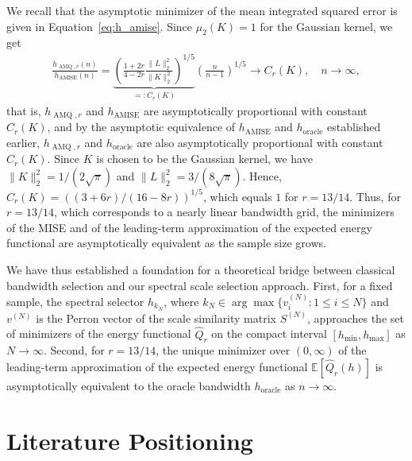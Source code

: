 We recall that the asymptotic minimizer of the mean integrated squared error is given in Equation~\eqref{eq:h_amise}. Since $\mu_2(K)=1$ for the Gaussian kernel, we get
\begin{align}\label{eq:h_amq_limit}
    \frac{h_{\operatorname{AMQ},r}(n)}{h_{\operatorname{AMISE}}(n)}=\underbrace{\left(\frac{1+2r}{4-2r}\frac{\|L\|_2^2}{\|K\|_2^2}\right)^{1/5}}_{=:C_r(K)}\left(\frac{n}{n-1}\right)^{1/5}\to C_r(K),\quad n\to\infty,
\end{align}
that is, $h_{\operatorname{AMQ},r}$ and $h_{\operatorname{AMISE}}$ are asymptotically proportional with constant $C_r(K)$, and by the asymptotic equivalence of $h_{\operatorname{AMISE}}$ and $h_{\text{oracle}}$ established earlier, $h_{\operatorname{AMQ},r}$ and $h_{\text{oracle}}$ are also asymptotically proportional with constant $C_r(K)$. Since $K$ is chosen to be the Gaussian kernel, we have $\|K\|_2^2=1/(2\sqrt{\pi})$ and $\|L\|_2^2=3/(8\sqrt{\pi})$. Hence, $C_r(K)=((3+6r)/(16-8r))^{1/5}$, which equals $1$ for $r=13/14$. Thus, for $r=13/14$, which corresponds to a nearly linear bandwidth grid, the minimizers of the MISE and of the leading-term approximation of the expected energy functional are asymptotically equivalent as the sample size grows.


We have thus established a foundation for a theoretical bridge between classical bandwidth selection and our spectral scale selection approach. First, for a fixed sample, the spectral selector $h_{k_N}$, where $k_N\in\arg\max\{v_i^{(N)}:1\le i\le N\}$ and $v^{(N)}$ is the Perron vector of the scale similarity matrix $S^{(N)}$, approaches the set of minimizers of the energy functional $\hat{Q}_r$ on the compact interval $[h_{\min},h_{\max}]$ as $N\to\infty$. Second, for $r=13/14$, the unique minimizer over $(0,\infty)$ of the leading-term approximation of the expected energy functional $\mathbb{E}[\hat{Q}_r(h)]$ is asymptotically equivalent to the oracle bandwidth $h_{\text{oracle}}$ as $n\to\infty$.


\section{Literature Positioning}\label{sec:literature_positioning}

